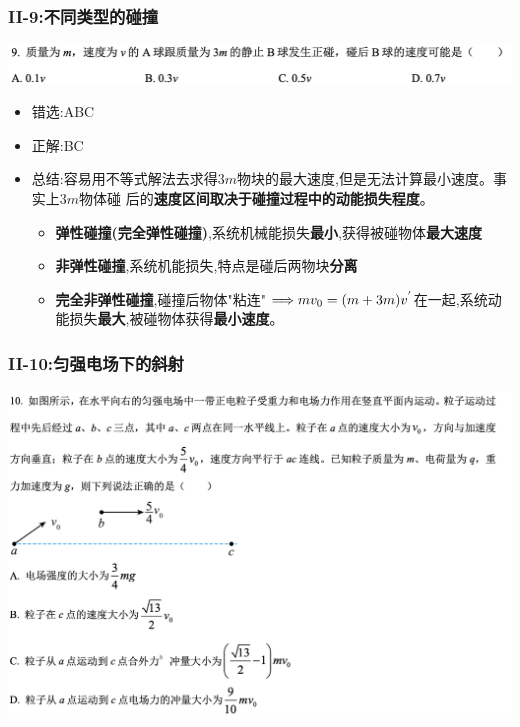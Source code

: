\documentclass{article}
\begin{document}
\vspace{2em}

\subsubsection{II-9:不同类型的碰撞}
\includegraphics[width=50em,keepaspectratio]{./pictures/1.1-2.png}

\begin{itemize}
    \item 错选:\quad ABC
    \item 正解:\quad BC
    \item 总结:\quad 容易用不等式解法去求得$3m$物块的最大速度,但是无法计算最小速度。事实上$3m$物体碰
          后的\textbf{速度区间取决于碰撞过程中的动能损失程度}。
          \begin{itemize}
              \item \textbf{弹性碰撞(完全弹性碰撞)},系统机械能损失\textbf{最小},获得被碰物体\textbf{最大速度}
              \item \textbf{非弹性碰撞},系统机能损失,特点是碰后两物块\textbf{分离}
              \item \textbf{完全非弹性碰撞},碰撞后物体"粘连"  $ \Longrightarrow mv_{0} = (m+3m)v^{'} $在一起,系统动能损失\textbf{最大},被碰物体获得\textbf{最小速度}。
          \end{itemize}
\end{itemize}

\vspace{2em}

\subsubsection{II-10:匀强电场下的斜射}
\includegraphics[width=50em,keepaspectratio]{./pictures/1.1-3.png}
\end{document}
